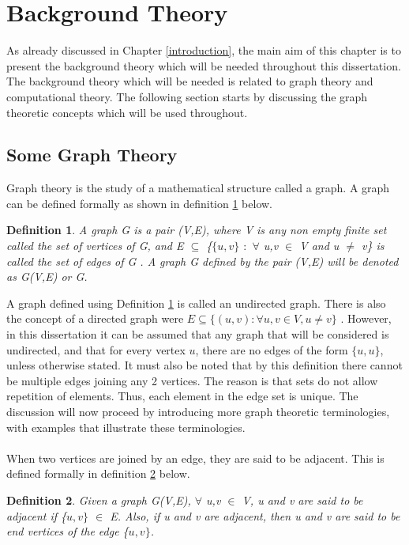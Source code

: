 \documentclass[12pt]{article}
\newtheorem{definition}{Definition}[subsection]
\numberwithin{equation}{subsection}
\numberwithin{table}{subsection}
\numberwithin{algorithm}{subsection}
\begin{document}
\newpage
{\center\section{Background Theory}
\label{background_theory}}
As already discussed in Chapter \ref{introduction}, the main aim of this chapter is to present the background theory which will be needed throughout this dissertation. The background theory which will be needed is related to graph theory and computational theory. The following section starts by discussing the graph theoretic concepts which will be used throughout. 
\subsection{Some Graph Theory}
\label{some_graph_theory}
Graph theory is the study of a mathematical structure called a graph. A graph can be defined formally as shown in definition \ref{Graph} below.
\begin{definition}
\label{Graph}
A graph G is a pair (V,E), where V is any non empty finite set called the set of vertices of G, and E $\subseteq$ \{$\{u,v\}$ $:$ $\forall$ u,v $\in$ V and u $\neq$ v\} is called the set of edges of G {}. A graph G defined by the pair (V,E) will be denoted as G(V,E) or G.
\end{definition}
A graph defined using Definition \ref{Graph} is called an undirected graph. There is also the concept of a directed graph were $\mathit{E \subseteq \{(u,v) : \forall u,v \in V, u \neq v\}}$ \cite{black_tanenbaum_2017}. However, in this dissertation it can be assumed that any graph that will be considered is undirected, and that for every vertex $u$, there are no edges of the form $\{u, u\}$, unless otherwise stated. It must also be noted that by this definition there cannot be multiple edges joining any 2 vertices. The reason is that sets do not allow repetition of elements. Thus, each element in the edge set is unique. The discussion will now proceed by introducing more graph theoretic terminologies, with examples that illustrate these terminologies.\\
\\When two vertices are joined by an edge, they are said to be adjacent. This is defined formally in definition \ref{adjacent} below.
\begin{definition}
\label{adjacent}
Given a graph G(V,E), $\forall$ u,v $\in$ V, u and v are said to be adjacent if \{$u,v\}$ $\in$ E. Also, if u and v are adjacent, then u and v are said to be end vertices of the edge \{$u,v\}$. 
\end{definition}
\end{document}
